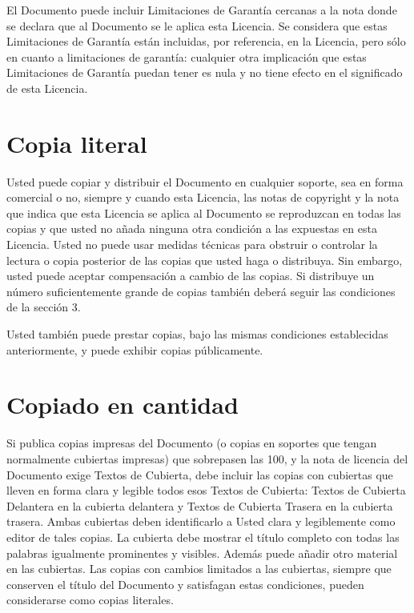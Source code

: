El Documento puede incluir Limitaciones de Garantía cercanas a la
nota donde se declara que al Documento se le aplica esta Licencia.
Se considera que estas Limitaciones de Garantía están incluidas, por
referencia, en la Licencia, pero sólo en cuanto a limitaciones de
garantía: cualquier otra implicación que estas Limitaciones de Garantía
puedan tener es nula y no tiene efecto en el significado de esta Licencia.


\section{Copia literal}

Usted puede copiar y distribuir el Documento en cualquier soporte,
sea en forma comercial o no, siempre y cuando esta Licencia, las notas
de copyright y la nota que indica que esta Licencia se aplica al Documento
se reproduzcan en todas las copias y que usted no añada ninguna otra
condición a las expuestas en esta Licencia. Usted no puede usar medidas
técnicas para obstruir o controlar la lectura o copia posterior de
las copias que usted haga o distribuya. Sin embargo, usted puede aceptar
compensación a cambio de las copias. Si distribuye un número suficientemente
grande de copias también deberá seguir las condiciones de la sección
3.

Usted también puede prestar copias, bajo las mismas condiciones establecidas
anteriormente, y puede exhibir copias públicamente.

\section{Copiado en cantidad}

Si publica copias impresas del Documento (o copias en soportes que
tengan normalmente cubiertas impresas) que sobrepasen las 100, y la
nota de licencia del Documento exige Textos de Cubierta, debe incluir
las copias con cubiertas que lleven en forma clara y legible todos
esos Textos de Cubierta: Textos de Cubierta Delantera en la cubierta
delantera y Textos de Cubierta Trasera en la cubierta trasera. Ambas
cubiertas deben identificarlo a Usted clara y legiblemente como editor
de tales copias. La cubierta debe mostrar el título completo con todas
las palabras igualmente prominentes y visibles. Además puede añadir
otro material en las cubiertas. Las copias con cambios limitados a
las cubiertas, siempre que conserven el título del Documento y satisfagan
estas condiciones, pueden considerarse como copias literales.

